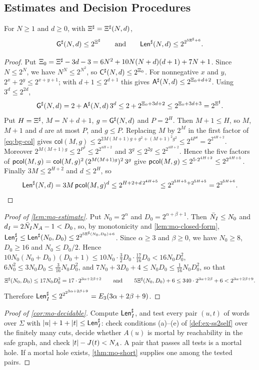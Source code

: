 \subsection{Estimates and Decision Procedures}\label{app:mo-estimates}

\begin{lemma}\label{lem:mo-closed-form}
For $N\ge1$ and $d\ge0$, with $\Xi^{\sharp}=\Xi^{\sharp}(N,d)$,
\[
 \mathsf{G}^{\sharp}(N,d)\le2^{\Xi^{\sharp}}
 \qquad\text{and}\qquad
 \mathsf{Len}^{\sharp}(N,d)\le2^{2^{5\Xi^{\sharp}+6}} .
\]
\end{lemma}

\begin{proof}
Put $\Xi_0=\Xi^{\sharp}-3d-3=6N^2+10N(N+d)(d+1)+7N+1$. Since $N\le2^N$, we have
$N^N\le2^{N^2}$, so $\mathsf{C}^{\sharp}(N,d)\le2^{\Xi_0}$. For nonnegative $x$ and $y$,
$2^x+2^y\le2^{x+y+1}$; with $d+1\le2^{d+1}$ this gives
$\mathsf{A}^{\sharp}(N,d)\le2^{\Xi_0+d+2}$. Using $3^d\le2^{2d}$,
\[
 \mathsf{G}^{\sharp}(N,d)=2+\mathsf{A}^{\sharp}(N,d)\,3^d\le2+2^{\Xi_0+3d+2}\le2^{\Xi_0+3d+3}
 =2^{\Xi^{\sharp}}.
\]
Put $H=\Xi^{\sharp}$, $M=N+d+1$, $g=\mathsf{G}^{\sharp}(N,d)$ and $P=2^H$. Then $M+1\le H$,
so $M$, $M+1$ and $d$ are at most $P$, and $g\le P$. Replacing $M$ by $2^M$ in
the first factor of \cref{eq:bg-col} gives
$\mathsf{col}(M,g)\le2^{2M(M+1)g+g^2+(M+1)^2g^2}\le2^{4P^4}=2^{2^{4H+2}}$.
Moreover $2^{M(M+1)g}\le2^{P^3}\le2^{2^{4H+2}}$ and
$3^g\le2^{2g}\le2^{2^{4H+2}}$. Hence the five factors of
$\mathsf{pcol}(M,g)=\mathsf{col}(M,g)^2\,(2^{M(M+1)g})^2\,3^g$ give
$\mathsf{pcol}(M,g)\le2^{5\cdot2^{4H+2}}\le2^{2^{4H+5}}$. Finally $3M\le2^{H+2}$ and
$d\le2^H$, so
\[
 \mathsf{Len}^{\sharp}(N,d)=3M\,\mathsf{pcol}(M,g)^d\le2^{H+2+d\,2^{4H+5}}\le
 2^{2^{5H+5}+2^{5H+5}}=2^{2^{5H+6}}. \qedhere
\]
\end{proof}

\begin{proof}[Proof of \cref{lem:mo-estimate}]
Put $N_0=2^\alpha$ and $D_0=2^{\alpha+\beta+1}$. Then $\bar N_I\le N_0$ and
$d_I=2\bar N_I N_A-1<D_0$, so, by monotonicity and \cref{lem:mo-closed-form},
$\mathsf{Len}^{\sharp}_I\le\mathsf{Len}^{\sharp}(N_0,D_0)\le2^{2^{5\Xi^{\sharp}(N_0,D_0)+6}}$. Since
$\alpha\ge3$ and $\beta\ge0$, we have $N_0\ge8$, $D_0\ge16$ and $N_0\le D_0/2$.
Hence $10N_0(N_0+D_0)(D_0+1)\le10N_0\cdot\frac32D_0\cdot\frac{17}{16}D_0<16N_0D_0^2$,
$6N_0^2\le3N_0D_0\le\frac3{16}N_0D_0^2$, and
$7N_0+3D_0+4\le N_0D_0\le\frac1{16}N_0D_0^2$, so that
\[
 \Xi^{\sharp}(N_0,D_0)\le17N_0D_0^2=17\cdot2^{3\alpha+2\beta+2}
 \qquad\text{and}\qquad
 5\Xi^{\sharp}(N_0,D_0)+6\le340\cdot2^{3\alpha+2\beta}+6<2^{3\alpha+2\beta+9}.
\]
Therefore $\mathsf{Len}^{\sharp}_I\le2^{2^{2^{3\alpha+2\beta+9}}}=E_3(3\alpha+2\beta+9)$.
\end{proof}

\begin{proof}[Proof of \cref{cor:mo-decidable}]
Compute $\mathsf{Len}^{\sharp}_I$, and test every pair $(u,t)$ of words over $\Sigma$ with
$\lvert u\rvert+1+\lvert t\rvert\le\mathsf{Len}^{\sharp}_I$: check conditions (a)--(e) of \cref{def:ex-ss2self}
over the finitely many cuts, decide whether $A(u)$ is mortal by reachability in
the safe graph, and check $\lvert t\rvert-J(t)<N_A$. A pair that passes all tests is a
mortal hole. If a mortal hole exists, \cref{thm:mo-short} supplies one among the
tested pairs.
\end{proof}
